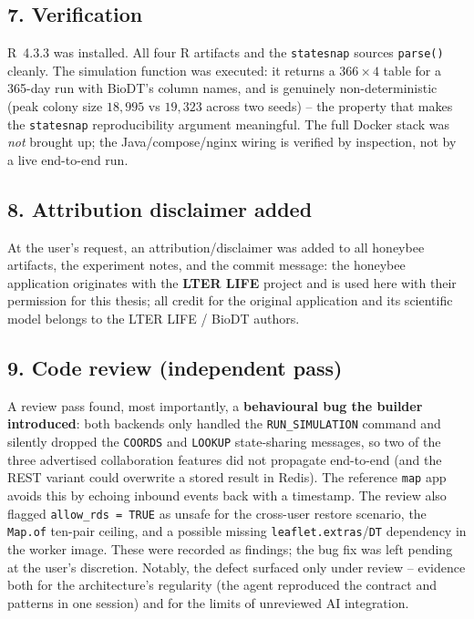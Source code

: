 \subsection*{7. Verification}

R~4.3.3 was installed. All four R artifacts and the \texttt{statesnap} sources
\texttt{parse()} cleanly. The simulation function was executed: it returns a
$366\times4$ table for a 365-day run with BioDT's column names, and is
genuinely non-deterministic (peak colony size $18{,}995$ vs $19{,}323$ across two
seeds) -- the property that makes the \texttt{statesnap} reproducibility argument
meaningful. The full Docker stack was \emph{not} brought up; the
Java/compose/nginx wiring is verified by inspection, not by a live end-to-end
run.

\subsection*{8. Attribution disclaimer added}

At the user's request, an attribution/disclaimer was added to all honeybee
artifacts, the experiment notes, and the commit message: the honeybee
application originates with the \textbf{LTER LIFE} project and is used here with
their permission for this thesis; all credit for the original application and its
scientific model belongs to the LTER LIFE / BioDT authors.

\subsection*{9. Code review (independent pass)}

A review pass found, most importantly, a \textbf{behavioural bug the builder
introduced}: both backends only handled the \texttt{RUN\_SIMULATION} command and
silently dropped the \texttt{COORDS} and \texttt{LOOKUP} state-sharing messages,
so two of the three advertised collaboration features did not propagate
end-to-end (and the REST variant could overwrite a stored result in Redis). The
reference \texttt{map} app avoids this by echoing inbound events back with a
timestamp. The review also flagged \texttt{allow\_rds = TRUE} as unsafe for the
cross-user restore scenario, the \texttt{Map.of} ten-pair ceiling, and a
possible missing \texttt{leaflet.extras}/\texttt{DT} dependency in the worker
image. These were recorded as findings; the bug fix was left pending at the
user's discretion. Notably, the defect surfaced only under review -- evidence
both for the architecture's regularity (the agent reproduced the contract and
patterns in one session) and for the limits of unreviewed AI integration.


